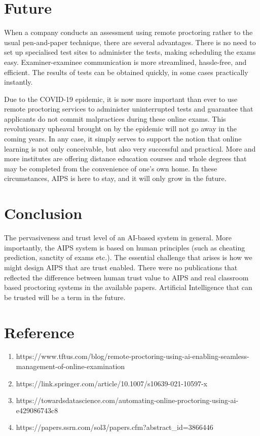 \documentclass[10pt,a4paper,twoside]{article}
\begin{document}
\section{Future }
\item When a company conducts an assessment using remote proctoring rather to the usual pen-and-paper technique, there are several advantages. There is no need to set up specialised test sites to administer the tests, making scheduling the exams easy. Examiner-examinee communication is more streamlined, hassle-free, and efficient.
The results of tests can be obtained quickly, in some cases practically instantly.
\item Due to the COVID-19 epidemic, it is now more important than ever to use remote proctoring services to administer uninterrupted tests and guarantee that applicants do not commit malpractices during these online exams. This revolutionary upheaval brought on by the epidemic will not go away in the coming years. In any case, it simply serves to support the notion that online learning is not only conceivable, but also very successful and practical. More and more institutes are offering distance education courses and whole degrees that may be completed from the convenience of one's own home. In these circumstances, AIPS is here to stay, and it will only grow in the future.


\section{Conclusion}
The pervasiveness and trust level of an AI-based system in general. More importantly, the AIPS system is based on human principles (such as cheating prediction, sanctity of exams etc.). The essential challenge that arises is how we might design AIPS that are trust enabled. There were no publications that reflected the difference between human trust value to AIPS and real classroom based proctoring systems in the available papers. Artificial Intelligence that can be trusted will be a term in the future.


\section{Reference}
\begin{enumerate}
\item https://www.tftus.com/blog/remote-proctoring-using-ai-enabling-seamless-management-of-online-examination
\item https://link.springer.com/article/10.1007/s10639-021-10597-x
\item https://towardsdatascience.com/automating-online-proctoring-using-ai-e429086743c8
\item https://papers.ssrn.com/sol3/papers.cfm?abstract\_id=3866446
\end{enumerate}
\end{document}
